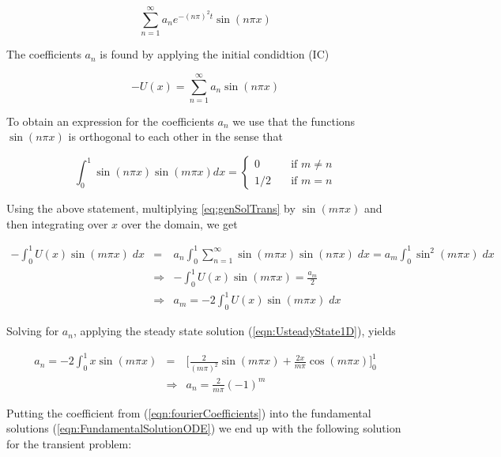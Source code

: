 \documentclass{article}
\begin{document}
\begin{equation}
\sum_{n=1}^{\infty} a_ne^{-(n\pi)^2 t}\sin(n \pi x)
\label{eqn:FundamentalSolutionODE}
\end{equation}

The coefficients $a_n$ is found by applying the initial condidtion (IC)

\begin{equation}\label{eq:genSolTrans}
-U(x) = \sum_{n=1}^{\infty} a_n\sin(n \pi x) 
\end{equation}

To obtain an expression for the coefficients $a_n$ we use that the functions $\sin(n\pi x)$ is orthogonal to each other in the sense that 

\begin{equation}
\int_0^1 \sin(n\pi x) \sin(m\pi x) dx = 
\begin{cases} 0 & \quad \text{if } m \neq n\\
1/2 & \quad \text{if } m = n 
\end{cases}
\label{eqn:orhogonalSine}
\end{equation}

Using the above statement, multiplying \ref{eq:genSolTrans} by $\sin(m\pi x)$  and then integrating over $x$ over the domain, we get 

\begin{eqnarray}
\nonumber
- \int_0^1 U(x)\sin(m\pi x)\;dx &=& a_n \int_0^1 \sum_{n=1}^{\infty} \sin(m\pi x)\sin(n\pi x)\;dx = a_m\int_0^1 \sin^2(m\pi x)\;dx\\ \nonumber
&\Rightarrow& - \int_0^1 U(x)\sin(m\pi x) =\frac{a_m}{2}\\ 
&\Rightarrow& a_m = - 2\int_0^1 U(x)\sin(m\pi x) \;dx
\end{eqnarray}

Solving for $a_n$, applying the steady state solution (\ref{eqn:UsteadyState1D}), yields 

\begin{eqnarray}
\nonumber
a_n = -2 \int_0^1 x \sin(m\pi x) &=& \Big[\frac{2}{(m\pi)^2} \sin(m\pi x) + \frac{2x}{m\pi}\cos(m\pi x)\Big]_0^1 \\ 
\label{eqn:fourierCoefficients}
&\Rightarrow & a_n = \frac{2}{m\pi}(-1)^m
\end{eqnarray}
\newline

Putting the coefficient from (\ref{eqn:fourierCoefficients}) into the fundamental solutions (\ref{eqn:FundamentalSolutionODE}) we end up with the following solution for the transient problem:
\end{document}
